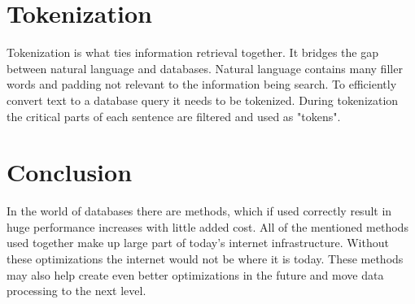 \documentclass[10pt,twoside,a4paper]{article}
\begin{document}
\section{Tokenization}
Tokenization is what ties information retrieval together. It bridges the gap between natural language and databases. 
Natural language contains many filler words and padding not relevant to the information being search. To efficiently convert text to a database query it needs to be tokenized. During tokenization the critical parts of each sentence are filtered and used as "tokens". \cite{Effective-Tokenization} %

\section{Conclusion}
In the world of databases there are methods, which if used correctly result in huge performance increases with little added cost. All of the mentioned methods used together make up large part of today's internet infrastructure. Without these optimizations the internet would not be where it is today. These methods may also help create even better optimizations in the future and move data processing to the next level. %





\end{document}
